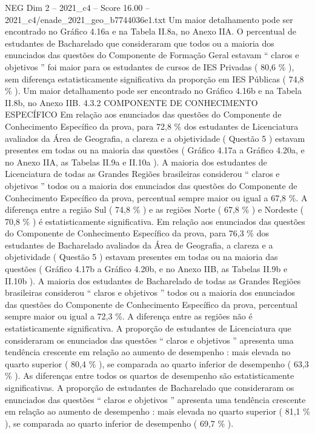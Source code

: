 \begin{textsample}{NEG Dim 2 – 2021\_c4 – Score 16.00 – 2021\_c4/enade\_2021\_geo\_b7744036e1.txt}
Um maior detalhamento pode ser encontrado no Gráfico 4.16a e na Tabela II.8a, no Anexo IIA.
O percentual de estudantes de Bacharelado que consideraram que todos ou a maioria dos enunciados das questões do Componente de Formação Geral estavam “ claros e objetivos ” foi maior para os estudantes de cursos de IES Privadas ( 80,6 \% ), sem diferença estatisticamente significativa da proporção em IES Públicas ( 74,8 \% ).
Um maior detalhamento pode ser encontrado no Gráfico 4.16b e na Tabela II.8b, no Anexo IIB. 4.3.2 COMPONENTE DE CONHECIMENTO ESPECÍFICO Em relação aos enunciados das questões do Componente de Conhecimento Específico da prova, para 72,8 \% dos estudantes de Licenciatura avaliados da Área de Geografia, a clareza e a objetividade ( Questão 5 ) estavam presentes em todas ou na maioria das questões ( Gráfico 4.17a a Gráfico 4.20a, e no Anexo IIA, as Tabelas II.9a e II.10a ).
A maioria dos estudantes de Licenciatura de todas as Grandes Regiões brasileiras considerou “ claros e objetivos ” todos ou a maioria dos enunciados das questões do Componente de Conhecimento Específico da prova, percentual sempre maior ou igual a 67,8 \%.
A diferença entre a região Sul ( 74,8 \% ) e as regiões Norte ( 67,8 \% ) e Nordeste ( 70,8 \% ) é estatisticamente significativa.
Em relação aos enunciados das questões do Componente de Conhecimento Específico da prova, para 76,3 \% dos estudantes de Bacharelado avaliados da Área de Geografia, a clareza e a objetividade ( Questão 5 ) estavam presentes em todas ou na maioria das questões ( Gráfico 4.17b a Gráfico 4.20b, e no Anexo IIB, as Tabelas II.9b e II.10b ).
A maioria dos estudantes de Bacharelado de todas as Grandes Regiões brasileiras considerou “ claros e objetivos ” todos ou a maioria dos enunciados das questões do Componente de Conhecimento Específico da prova, percentual sempre maior ou igual a 72,3 \%.
A diferença entre as regiões não é estatisticamente significativa.
A proporção de estudantes de Licenciatura que consideraram os enunciados das questões “ claros e objetivos ” apresenta uma tendência crescente em relação ao aumento de desempenho : mais elevada no quarto superior ( 80,4 \% ), se comparada ao quarto inferior de desempenho ( 63,3 \% ).
As diferenças entre todos os quartos de desempenho são estatisticamente significativas.
A proporção de estudantes de Bacharelado que consideraram os enunciados das questões “ claros e objetivos ” apresenta uma tendência crescente em relação ao aumento de desempenho : mais elevada no quarto superior ( 81,1 \% ), se comparada ao quarto inferior de desempenho ( 69,7 \% ).

\end{textsample}
